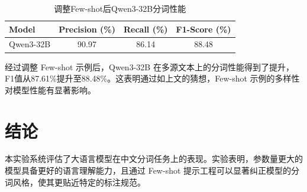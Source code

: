 \documentclass[a4paper,12pt]{ctexart} %
\begin{document}
\begin{table}[H]
    \centering
    \caption{调整Few-shot后Qwen3-32B分词性能}
    \label{tab:cresult}
    \begin{tabular}{l c c c}
        \toprule
        \textbf{Model} & \textbf{Precision (\%)} & \textbf{Recall (\%)} & \textbf{F1-Score (\%)} \\
        \midrule

        Qwen3-32B     & 90.97 & 86.14 & 88.48 \\
        
        \bottomrule
    \end{tabular}
\end{table}
经过调整 Few-shot 示例后，Qwen3-32B 在多源文本上的分词性能得到了提升，F1值从87.61\%提升至88.48\%。这表明通过如上文的猜想，Few-shot 示例的多样性对模型性能有显著影响。
\section{结论}
本实验系统评估了大语言模型在中文分词任务上的表现。实验表明，参数量更大的模型具备更好的语言理解能力，且通过 Few-shot 提示工程可以显著纠正模型的分词风格，使其更贴近特定的标注规范。
\end{document}
